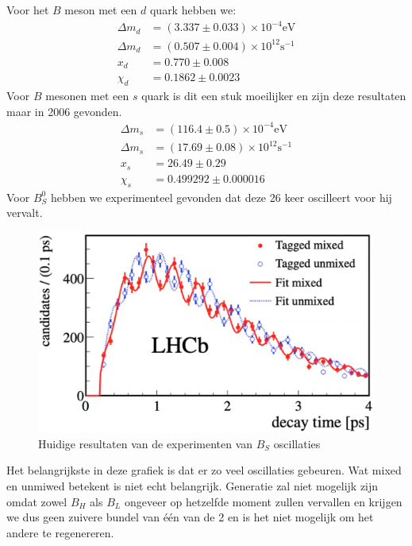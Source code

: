 \documentclass[../main.tex]{subfiles}
\begin{document}
Voor het $B$ meson met een $d$ quark hebben we:
\begin{equation}
    \begin{aligned}
        \label{eq:b_d_resultaten}
        \Delta m_{d} &=(3.337 \pm 0.033) \times 10^{-4} \text{eV} \\
        \Delta m_{d} &=(0.507 \pm 0.004) \times 10^{12} \text{s}^{-1}\\
        x_{d}&=0.770 \pm 0.008 \\
        \chi_{d}&=0.1862 \pm 0.0023
    \end{aligned}
\end{equation}
Voor $B$ mesonen met een $s$ quark is dit een stuk moeilijker en zijn deze resultaten maar in 2006 gevonden.
\begin{equation}
    \begin{aligned}
        \label{eq:b_s_resultaten}
        \Delta m_{s}&=(116.4 \pm 0.5) \times 10^{-4} \text{eV} \\
        \Delta m_{s}&=(17.69 \pm 0.08) \times 10^{12} \text{s}^{-1}\\
        x_{s}&=26.49 \pm 0.29 \\
        \chi_{s}&=0.499292 \pm 0.000016
    \end{aligned}
\end{equation}
Voor $B_S^0$ hebben we experimenteel gevonden dat deze 26 keer oscilleert voor hij vervalt.

\begin{figure}[h]
    \centering
    \includegraphics[width=0.5\linewidth]{meson_mixing_and_oscillations/b_s_osc_res.png}
    \caption{Huidige resultaten van de experimenten van $B_S$ oscillaties}%
    \label{fig:meson_mixing_and_oscillations/b_s_osc_res}
\end{figure}

Het belangrijkste in deze grafiek is dat er zo veel oscillaties gebeuren. Wat mixed en unmiwed betekent is niet echt belangrijk. Generatie zal niet mogelijk zijn omdat zowel $B_H$ als $B_L$ ongeveer op hetzelfde moment zullen vervallen en krijgen we dus geen zuivere bundel van één van de 2 en is het niet mogelijk om het andere te regenereren.
\end{document}
